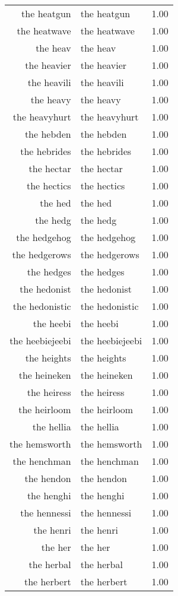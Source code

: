 \begin{table}[ht]
\begin{tabular}{rlr}
  the heatgun & the heatgun & 1.00 \\ 
  the heatwave & the heatwave & 1.00 \\ 
  the heav & the heav & 1.00 \\ 
  the heavier & the heavier & 1.00 \\ 
  the heavili & the heavili & 1.00 \\ 
  the heavy & the heavy & 1.00 \\ 
  the heavyhurt & the heavyhurt & 1.00 \\ 
  the hebden & the hebden & 1.00 \\ 
  the hebrides & the hebrides & 1.00 \\ 
  the hectar & the hectar & 1.00 \\ 
  the hectics & the hectics & 1.00 \\ 
  the hed & the hed & 1.00 \\ 
  the hedg & the hedg & 1.00 \\ 
  the hedgehog & the hedgehog & 1.00 \\ 
  the hedgerows & the hedgerows & 1.00 \\ 
  the hedges & the hedges & 1.00 \\ 
  the hedonist & the hedonist & 1.00 \\ 
  the hedonistic & the hedonistic & 1.00 \\ 
  the heebi & the heebi & 1.00 \\ 
  the heebiejeebi & the heebiejeebi & 1.00 \\ 
  the heights & the heights & 1.00 \\ 
  the heineken & the heineken & 1.00 \\ 
  the heiress & the heiress & 1.00 \\ 
  the heirloom & the heirloom & 1.00 \\ 
  the hellia & the hellia & 1.00 \\ 
  the hemsworth & the hemsworth & 1.00 \\ 
  the henchman & the henchman & 1.00 \\ 
  the hendon & the hendon & 1.00 \\ 
  the henghi & the henghi & 1.00 \\ 
  the hennessi & the hennessi & 1.00 \\ 
  the henri & the henri & 1.00 \\ 
  the her & the her & 1.00 \\ 
  the herbal & the herbal & 1.00 \\ 
  the herbert & the herbert & 1.00 \\ 

\end{tabular}
\end{table}

